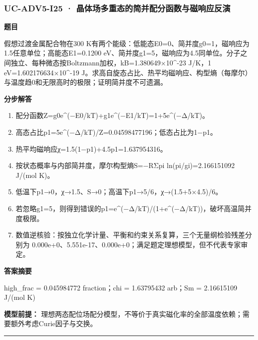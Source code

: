 \documentclass[UTF8,11pt,a4paper]{ctexart}
\begin{document}
\subsubsection*{UC-ADV5-I25 · 晶体场多重态的简并配分函数与磁响应反演}
\noindent\textbf{题目}\par
假想过渡金属配合物在300 K有两个能级：低能态E0=0、简并度g0=1，磁响应为1.5任意单位；高能态E1=0.1200 eV、简并度g1=5，磁响应为4.5同单位。分子之间独立、每种微态按Boltzmann加权，kB=1.380649×10\textasciicircum{}-23 J/K，1 eV=1.602176634×10\textasciicircum{}-19 J。求高自旋态占比、热平均磁响应、构型熵（每摩尔）与温度趋0和无限高时的极限；证明简并度不可遗漏。\par
\medskip\noindent\textbf{分步解答}
\begin{enumerate}
\item 配分函数Z=g0e\textasciicircum{}(−E0/kT)+g1e\textasciicircum{}(−E1/kT)=1+5e\textasciicircum{}(−Δ/kT)。
\item 高态占比p1=5e\textasciicircum{}(−Δ/kT)/Z=0.04598477196；低态占比为1−p1。
\item 热平均磁响应χ=1.5(1−p1)+4.5p1=1.637954316。
\item 按状态概率与内部简并度，摩尔构型熵S=−RΣpi ln(pi/gi)=2.166151092 J/(mol K)。
\item 低温下p1→0，χ→1.5、S→0；高温下p1→5/6，χ→(1.5+5×4.5)/6。
\item 若忽略g1=5，则得到错误的p1=e\textasciicircum{}(−Δ/kT)/(1+e\textasciicircum{}(−Δ/kT))，破坏高温简并度极限。
\item 数值逆核验：按独立化学计量、平衡和约束关系复算，三个无量纲检验残差分别为 0.000e+0、5.551e-17、0.000e+0；满足题定理想模型，但不代表专家审定。
\end{enumerate}
\noindent\textbf{答案摘要}\par
high\_frac = 0.045984772 fraction；chi = 1.63795432 arb；Sm = 2.16615109 J/(mol K)\par
\noindent\textbf{模型前提：}
理想两态配位场配分模型，不等价于真实磁化率的全部温度依赖；需要额外考虑Curie因子与交换。\par
\medskip\hrule\medskip
{}
\end{document}
